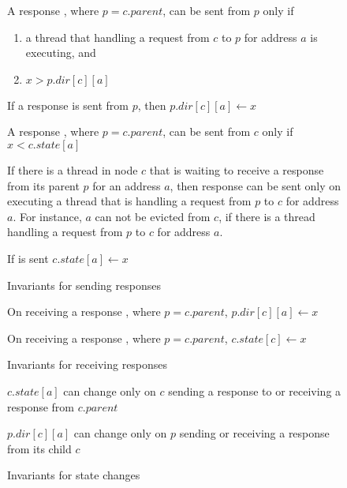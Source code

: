 \begin{figure}
\begin{inv}
A response , where $p = c.parent$, can be sent from $p$ only
if
\begin{enumerate}
\item a thread that handling a request from $c$ to $p$ for
address $a$ is executing, and
\item $x > p.dir[c][a]$
\end{enumerate}
\label{cSendRespPre}
\end{inv}
\begin{inv}
If a response  is sent from $p$, then $p.dir[c][a] \gets x$
\label{cSendRespPost}
\end{inv}
\begin{inv}
A response , where $p = c.parent$, can be sent from $c$ only
if $x < c.state[a]$ \label{pSendRespPre1}
\end{inv}
\begin{inv}
If there is a thread in node $c$ that is waiting to receive a response from its
parent $p$ for an address $a$, then response  can be sent only
on executing a thread that is handling a request from $p$ to $c$ for address
$a$. For instance, $a$ can not be evicted from $c$, if there is a thread
handling a request from $p$ to $c$ for address $a$.
\label{pSendRespPre2}
\end{inv}
\begin{inv}
If  is sent $c.state[a] \gets x$
\label{pSendRespPost}
\end{inv}
\caption{Invariants for sending responses}
\label{sendResp}
\end{figure}

\begin{figure}
\begin{inv}
On receiving a response , where $p = c.parent$, $p.dir[c][a]
\gets x$
\label{pRecvResp}
\end{inv}
\begin{inv}
On receiving a response , where $p = c.parent$, $c.state[c]
\gets x$
\label{cRecvResp}
\end{inv}
\caption{Invariants for receiving responses}
\label{recvResp}
\end{figure}

\begin{figure}
\begin{inv}
$c.state[a]$ can change only on $c$ sending a response to or receiving a
response from $c.parent$
\label{cState}
\end{inv}
\begin{inv}
$p.dir[c][a]$ can change only on $p$ sending or receiving a response from
its child $c$
\label{pState}
\end{inv}
\caption{Invariants for state changes}
\label{stateChange}
\end{figure}


